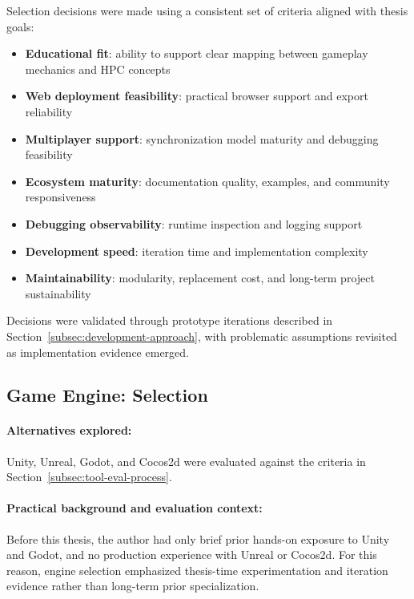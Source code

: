 Selection decisions were made using a consistent set of criteria aligned with thesis goals:
\begin{itemize}
    \item \textbf{Educational fit}: ability to support clear mapping between gameplay mechanics and HPC concepts
    \item \textbf{Web deployment feasibility}: practical browser support and export reliability
    \item \textbf{Multiplayer support}: synchronization model maturity and debugging feasibility
    \item \textbf{Ecosystem maturity}: documentation quality, examples, and community responsiveness
    \item \textbf{Debugging observability}: runtime inspection and logging support
    \item \textbf{Development speed}: iteration time and implementation complexity
    \item \textbf{Maintainability}: modularity, replacement cost, and long-term project sustainability
\end{itemize}

Decisions were validated through prototype iterations described in Section~\ref{subsec:development-approach}, with problematic assumptions revisited as implementation evidence emerged.

\subsection{Game Engine: Selection}
\label{subsec:godot-selection}

\paragraph*{Alternatives explored:}

Unity, Unreal, Godot, and Cocos2d were evaluated against the criteria in Section~\ref{subsec:tool-eval-process}.

\paragraph*{Practical background and evaluation context:}
Before this thesis, the author had only brief prior hands-on exposure to Unity and Godot, and no production experience with Unreal or Cocos2d. For this reason, engine selection emphasized thesis-time experimentation and iteration evidence rather than long-term prior specialization.

